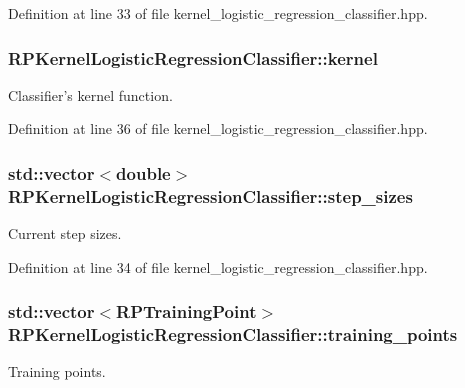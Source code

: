 \-Definition at line 33 of file kernel\-\_\-logistic\-\_\-regression\-\_\-classifier.\-hpp.

\hypertarget{class_r_p_kernel_logistic_regression_classifier_ae88d931ebd067f4a290913447a493962}{
\subsubsection[{kernel}]{ {\bf \-R\-P\-Kernel\-Logistic\-Regression\-Classifier\-::kernel}}}\label{class_r_p_kernel_logistic_regression_classifier_ae88d931ebd067f4a290913447a493962}
\-Classifier's kernel function. 

\-Definition at line 36 of file kernel\-\_\-logistic\-\_\-regression\-\_\-classifier.\-hpp.

\hypertarget{class_r_p_kernel_logistic_regression_classifier_a9da47f0a98cf88d670eb3458c778f50a}{
\subsubsection[{step\-\_\-sizes}]{\setlength{\rightskip}{0pt plus 5cm}std\-::vector$<$double$>$ {\bf \-R\-P\-Kernel\-Logistic\-Regression\-Classifier\-::step\-\_\-sizes}}}\label{class_r_p_kernel_logistic_regression_classifier_a9da47f0a98cf88d670eb3458c778f50a}
\-Current step sizes. 

\-Definition at line 34 of file kernel\-\_\-logistic\-\_\-regression\-\_\-classifier.\-hpp.

\hypertarget{class_r_p_kernel_logistic_regression_classifier_acbfcf7c3dc66d0bd1e1b1a11fc05f2b5}{
\subsubsection[{training\-\_\-points}]{\setlength{\rightskip}{0pt plus 5cm}std\-::vector$<${\bf \-R\-P\-Training\-Point}$>$ {\bf \-R\-P\-Kernel\-Logistic\-Regression\-Classifier\-::training\-\_\-points}}}\label{class_r_p_kernel_logistic_regression_classifier_acbfcf7c3dc66d0bd1e1b1a11fc05f2b5}
\-Training points. 

